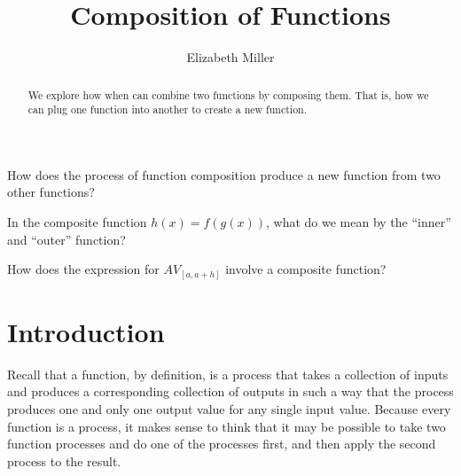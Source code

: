 \documentclass{ximera}
\author{Elizabeth Miller}
\title{Composition of Functions}
\begin{document}
\begin{abstract}
  We explore how when can combine two functions by composing them.  That is, how we can plug one function into another to create a new function.
\end{abstract}
\maketitle



\begin{motivatingQuestions}
\item How does the process of function composition produce a new function from two other functions?
\item In the composite function \(h(x) = f(g(x))\), what do we mean by the ``inner'' and ``outer'' function?  
\item How does the expression for \(AV_{[a,a+h]}\) involve a composite function?
\end{motivatingQuestions}



\section{Introduction}
Recall that a function, by definition, is a process that takes a collection of inputs and produces a corresponding collection of outputs in such a way that the process produces one and only one output value for any single input value.  Because every function is a process, it makes sense to think that it may be possible to take two function processes and do one of the processes first, and then apply the second process to the result.
\end{document}
